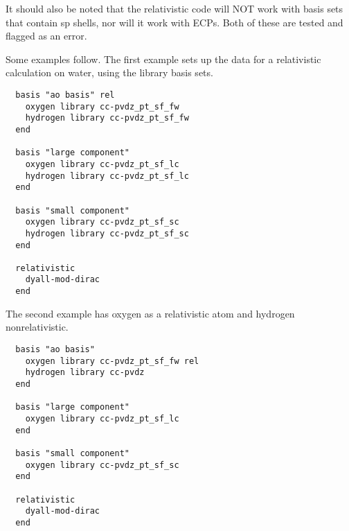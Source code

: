 It should also be noted that the relativistic code will NOT work with basis
sets that contain sp shells, nor will it work with ECPs. Both of these are
tested and flagged as an error.

Some examples follow. The first example sets up the data for a relativistic
calculation on water, using the library basis sets.

\begin{verbatim}
  basis "ao basis" rel
    oxygen library cc-pvdz_pt_sf_fw
    hydrogen library cc-pvdz_pt_sf_fw
  end

  basis "large component"
    oxygen library cc-pvdz_pt_sf_lc
    hydrogen library cc-pvdz_pt_sf_lc
  end

  basis "small component"
    oxygen library cc-pvdz_pt_sf_sc
    hydrogen library cc-pvdz_pt_sf_sc
  end

  relativistic
    dyall-mod-dirac
  end
\end{verbatim}

The second example has oxygen as a relativistic atom and hydrogen nonrelativistic.

\begin{verbatim}
  basis "ao basis"
    oxygen library cc-pvdz_pt_sf_fw rel
    hydrogen library cc-pvdz
  end

  basis "large component"
    oxygen library cc-pvdz_pt_sf_lc
  end

  basis "small component"
    oxygen library cc-pvdz_pt_sf_sc
  end

  relativistic
    dyall-mod-dirac
  end
\end{verbatim}
